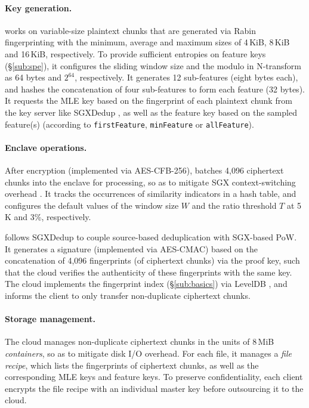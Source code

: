 \paragraph{Key generation.}
\prototype works on variable-size plaintext chunks that are generated via Rabin fingerprinting \cite{rabin81} with the minimum, average and maximum sizes of 4\,KiB, 8\,KiB and 16\,KiB, respectively. To provide sufficient entropies on feature keys (\S\ref{sub:spe}), it configures the sliding window size and the modulo in N-transform as 64 bytes and $2^{64}$, respectively.
It generates 12 sub-features (eight bytes each), and hashes the concatenation of four sub-features to form each feature (32 bytes). It requests the MLE key based on the fingerprint of each plaintext chunk from the key server like SGXDedup \cite{ren21}, as well as the feature key based on the sampled feature(s) (according to {\tt firstFeature}, {\tt minFeature} or {\tt allFeature}).


\paragraph{Enclave operations.}
After encryption (implemented via AES-CFB-256), \prototype batches 4,096 ciphertext chunks into the enclave for processing, so as to mitigate SGX context-switching overhead \cite{arnautov16}. It tracks the occurrences of similarity indicators in a hash table, and
configures the default values of the window size $W$ and the ratio threshold $T$ at 5\,K and 3\%, respectively.

\prototype follows SGXDedup to couple source-based deduplication with SGX-based PoW. It generates a signature  (implemented via AES-CMAC) based on the concatenation of 4,096 fingerprints (of ciphertext chunks) via the proof key, such that the cloud verifies the authenticity of these fingerprints with the same key.  The cloud implements the  fingerprint index (\S\ref{sub:basics}) via LevelDB \cite{leveldb}, and informs the client to only transfer non-duplicate ciphertext chunks.



\paragraph{Storage management.}
The cloud manages non-duplicate ciphertext chunks in the units of 8\,MiB {\em containers}, so as to mitigate disk I/O overhead. For each file, it manages a {\em file recipe}, which lists the fingerprints of ciphertext chunks, as well as the corresponding MLE keys and feature keys. To preserve confidentiality, each client encrypts the file recipe with an individual master key before outsourcing it to the cloud.

